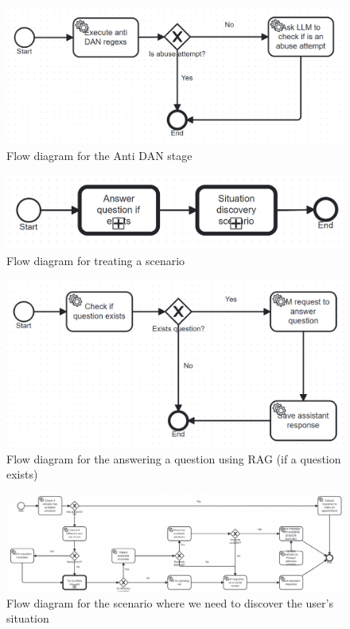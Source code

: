 \documentclass[a4paper,12pt,twoside]{ThesisStyle}
\begin{document}
\begin{figure}[H]
  \centering
  \includegraphics[width=1\textwidth]{img/Execute_anti_DAN.bpmn20.png}
  \caption{Flow diagram for the Anti DAN stage}
  \label{fig:antidan}
\end{figure}

\begin{figure}[H]
  \centering
  \includegraphics[width=1\textwidth]{img/Treat_conversation_scenario.bpmn20.png}
  \caption{Flow diagram for treating a scenario}
  \label{fig:treatscenario}
\end{figure}

\begin{figure}[H]
  \centering
  \includegraphics[width=1\textwidth]{img/Answer_question_if_exists.bpmn20.png}
  \caption{Flow diagram for the answering a question using RAG (if a question exists)}
  \label{fig:answerragquestionifexists}
\end{figure}

\begin{figure}[H]
  \centering
  \includegraphics[width=1\textwidth]{img/Situation_discovery_scenario.bpmn20.png}
  \caption{Flow diagram for the scenario where we need to discover the user's situation}
  \label{fig:executesituationdiscoveryscenario}
\end{figure}
\end{document}
